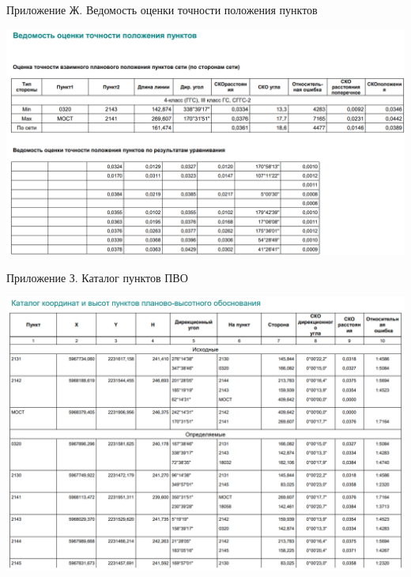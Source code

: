 \documentclass[a4paper]{article}
\begin{document}
\begin{newpage}

    \begin{landscape}
        \begin{center}
            \begin{flushright}
                Приложение Ж. Ведомость оценки точности положения пунктов
            \end{flushright}
            
            \includegraphics[scale=1]{votpp.png}
        \end{center}
    \end{landscape}

\end{newpage}

\begin{newpage}

    \begin{landscape}
        \begin{center}
            \begin{flushright}
                Приложение З. Каталог пунктов ПВО
            \end{flushright}
            
            \includegraphics[scale=0.93]{kkivpp-vo.png}
        \end{center}
    \end{landscape}

\end{newpage}
\end{document}
